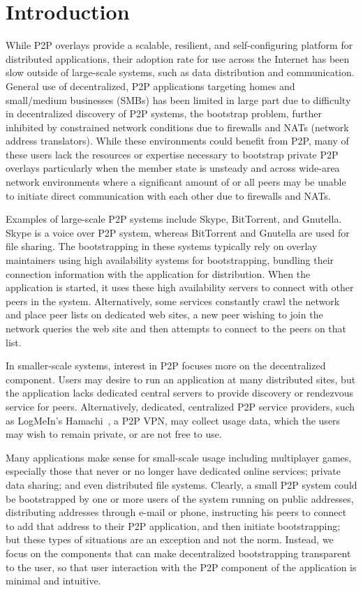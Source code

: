 \documentclass[conference]{IEEEtran}
\begin{document}
\section{Introduction}

While P2P overlays provide a scalable, resilient, and self-configuring platform
for distributed applications, their adoption rate for use across the Internet
has been slow outside of large-scale systems, such as data distribution and
communication.  General use of decentralized, P2P applications targeting homes
and small/medium businesses (SMBs) has been limited in large part due to
difficulty in decentralized discovery of P2P systems, the bootstrap problem,
further inhibited by constrained network conditions due to firewalls and NATs
(network address translators).  While these environments could benefit from
P2P, many of these users lack the resources or expertise necessary to bootstrap
private P2P overlays particularly when the member state is unsteady and across
wide-area network environments where a significant amount of or all peers may
be unable to initiate direct communication with each other due to firewalls and
NATs.

Examples of large-scale P2P systems include Skype, BitTorrent, and Gnutella.
Skype is a voice over P2P system, whereas BitTorrent and Gnutella are used for
file sharing.  The bootstrapping in these systems typically rely on overlay
maintainers using high availability systems for bootstrapping, bundling their
connection information with the application for distribution.  When the
application is started, it uses these high availability servers to connect with
other peers in the system.  Alternatively, some services constantly crawl the
network and place peer lists on dedicated web sites, a new peer wishing to join
the network queries the web site and then attempts to connect to the peers on
that list.

In smaller-scale systems, interest in P2P focuses more on the decentralized
component.  Users may desire to run an application at many distributed sites,
but the application lacks dedicated central servers to provide discovery or
rendezvous service for peers.  Alternatively, dedicated, centralized P2P
service providers, such as LogMeIn's Hamachi~\cite{hamachi}, a P2P VPN, may
collect usage data, which the users may wish to remain private, or are not free
to use.  

Many applications make sense for small-scale usage including multiplayer games,
especially those that never or no longer have dedicated online services;
private data sharing; and even distributed file systems.  Clearly, a small P2P
system could be bootstrapped by one or more users of the system running on
public addresses, distributing addresses through e-mail or phone, instructing
his peers to connect to add that address to their P2P application, and then
initiate bootstrapping; but these types of situations are an exception and not
the norm.  Instead, we focus on the components that can make decentralized
bootstrapping transparent to the user, so that user interaction with the P2P
component of the application is minimal and intuitive.
\end{document}
